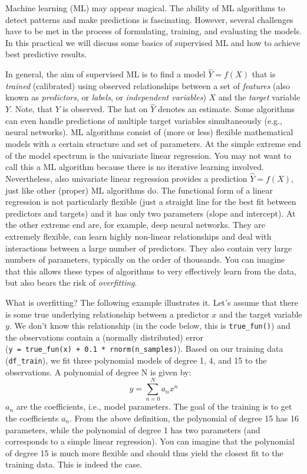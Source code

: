 \documentclass[
]{book}
\begin{document}
Machine learning (ML) may appear magical. The ability of ML algorithms to detect patterns and make predictions is fascinating. However, several challenges have to be met in the process of formulating, training, and evaluating the models. In this practical we will discuss some basics of supervised ML and how to achieve best predictive results.

In general, the aim of supervised ML is to find a model \(\hat{Y} = f(X)\) that is \emph{trained} (calibrated) using observed relationships between a set of \emph{features} (also known as \emph{predictors}, or \emph{labels}, or \emph{independent variables}) \(X\) and the \emph{target} variable \(Y\). Note, that \(Y\) is observed. The hat on \(\hat{Y}\) denotes an estimate. Some algorithms can even handle predictions of multiple target variables simultaneously (e.g., neural networks). ML algorithms consist of (more or less) flexible mathematical models with a certain structure and set of parameters. At the simple extreme end of the model spectrum is the univariate linear regression. You may not want to call this a ML algorithm because there is no iterative learning involved. Nevertheless, also univariate linear regression provides a prediction \(\hat{Y} = f(X)\), just like other (proper) ML algorithms do. The functional form of a linear regression is not particularly flexible (just a straight line for the best fit between predictors and targets) and it has only two parameters (slope and intercept). At the other extreme end are, for example, deep neural networks. They are extremely flexible, can learn highly non-linear relationships and deal with interactions between a large number of predictors. They also contain very large numbers of parameters, typically on the order of thousands. You can imagine that this allows these types of algorithms to very effectively learn from the data, but also bears the risk of \emph{overfitting}.

What is overfitting? The following example illustrates it. Let's assume that there is some true underlying relationship between a predictor \(x\) and the target variable \(y\). We don't know this relationship (in the code below, this is \texttt{true\_fun()}) and the observations contain a (normally distributed) error (\texttt{y\ =\ true\_fun(x)\ +\ 0.1\ *\ rnorm(n\_samples)}). Based on our training data (\texttt{df\_train}), we fit three polynomial models of degree 1, 4, and 15 to the observations. A polynomial of degree N is given by: \[
y = \sum_{n=0}^N a_n x^n
\] \(a_n\) are the coefficients, i.e., model parameters. The goal of the training is to get the coefficients \(a_n\). From the above definition, the polynomial of degree 15 has 16 parameters, while the polynomial of degree 1 has two parameters (and corresponds to a simple linear regression). You can imagine that the polynomial of degree 15 is much more flexible and should thus yield the closest fit to the training data. This is indeed the case.
\end{document}
